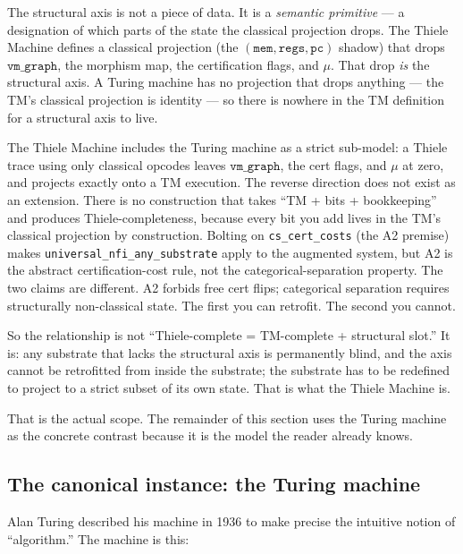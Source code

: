 \documentclass[11pt,a4paper]{article}
\theoremstyle{plain}
\theoremstyle{definition}
\theoremstyle{remark}
\begin{document}
The structural axis is not a piece of data. It is a \emph{semantic primitive} --- a designation of which parts of the state the classical projection drops. The Thiele Machine defines a classical projection (the $(\texttt{mem}, \texttt{regs}, \texttt{pc})$ shadow) that drops $\texttt{vm\_graph}$, the morphism map, the certification flags, and $\mu$. That drop \emph{is} the structural axis. A Turing machine has no projection that drops anything --- the TM's classical projection is identity --- so there is nowhere in the TM definition for a structural axis to live.

The Thiele Machine includes the Turing machine as a strict sub-model: a Thiele trace using only classical opcodes leaves $\texttt{vm\_graph}$, the cert flags, and $\mu$ at zero, and projects exactly onto a TM execution. The reverse direction does not exist as an extension. There is no construction that takes ``TM + bits + bookkeeping'' and produces Thiele-completeness, because every bit you add lives in the TM's classical projection by construction. Bolting on \texttt{cs\_cert\_costs} (the A2 premise) makes \texttt{universal\_nfi\_any\_substrate} apply to the augmented system, but A2 is the abstract certification-cost rule, not the categorical-separation property. The two claims are different. A2 forbids free cert flips; categorical separation requires structurally non-classical state. The first you can retrofit. The second you cannot.

So the relationship is not ``Thiele-complete = TM-complete + structural slot.'' It is: any substrate that lacks the structural axis is permanently blind, and the axis cannot be retrofitted from inside the substrate; the substrate has to be redefined to project to a strict subset of its own state. That is what the Thiele Machine is.

That is the actual scope. The remainder of this section uses the Turing machine as the concrete contrast because it is the model the reader already knows.

\subsection{The canonical instance: the Turing machine}

Alan Turing described his machine in 1936 to make precise the intuitive notion of ``algorithm.'' The machine is this:
\end{document}
